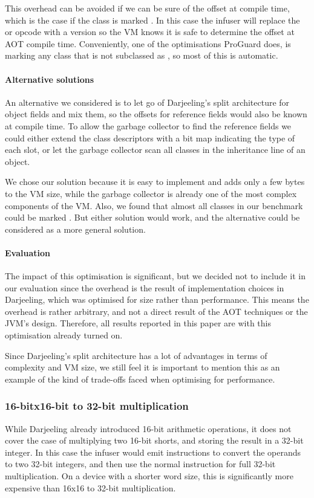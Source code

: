This overhead can be avoided if we can be sure of the offset at compile time, which is the case if the class is marked . In this case the infuser will replace the  or  opcode with a  version so the VM knows it is safe to determine the offset at AOT compile time. Conveniently, one of the optimisations ProGuard does, is marking any class that is not subclassed as , so most of this is automatic.

\paragraph{Alternative solutions} An alternative we considered is to let go of Darjeeling's split architecture for object fields and mix them, so the offsets for reference fields would also be known at compile time. To allow the garbage collector to find the reference fields we could either extend the class descriptors with a bit map indicating the type of each slot, or let the garbage collector scan all classes in the inheritance line of an object.

We chose our solution because it is easy to implement and adds only a few bytes to the VM size, while the garbage collector is already one of the most complex components of the VM. Also, we found that almost all classes in our benchmark could be marked . But either solution would work, and the alternative could be considered as a more general solution.

\paragraph{Evaluation}
The impact of this optimisation is significant, but we decided not to include it in our evaluation since the overhead is the result of implementation choices in Darjeeling, which was optimised for size rather than performance. This means the overhead is rather arbitrary, and not a direct result of the AOT techniques or the JVM's design. Therefore, all results reported in this paper are with this optimisation already turned on.

Since Darjeeling's split architecture has a lot of advantages in terms of complexity and VM size, we still feel it is important to mention this as an example of the kind of trade-offs faced when optimising for performance.

\subsubsection{ 16-bitx16-bit to 32-bit multiplication}
While Darjeeling already introduced 16-bit arithmetic operations, it does not cover the case of multiplying two 16-bit shorts, and storing the result in a 32-bit integer. In this case the infuser would emit  instructions to convert the operands to two 32-bit integers, and then use the normal  instruction for full 32-bit multiplication. On a device with a shorter word size, this is significantly more expensive than 16x16 to 32-bit multiplication.

